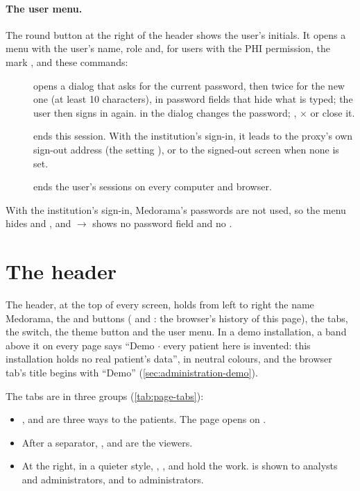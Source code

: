 \paragraph{The user menu.} The round button at the right of the header shows the user's
initials. It opens a menu with the user's name, role and, for users with the PHI permission, the
mark , and these commands:
\begin{description}
\item[] opens a dialog that asks for the current password, then twice for
  the new one (at least 10 characters), in password fields that hide what is typed; the user
  then signs in again.  in the dialog changes the password; , $\times$ or
   close it.
\item[] ends this session. With the institution's sign-in, it leads to the proxy's
  own sign-out address (the setting ), or to the signed-out screen when
  none is set.
\item[] ends the user's sessions on every computer and browser.
\end{description}
With the institution's sign-in, Medorama's passwords are not used, so the menu hides
 and , and  $\rightarrow$ 
shows no password field and no .

\section{The header}
\label{sec:page-header}

The header, at the top of every screen, holds from left to right the name Medorama, the
\ui{$\langle$} and \ui{$\rangle$} buttons ( and : the browser's history of
this page), the tabs, the  switch, the theme button and the user menu. In a
demo installation, a band above it on every page says ``Demo $\cdot$ every patient here is
invented: this installation holds no real patient's data'', in neutral colours, and the browser
tab's title begins with ``Demo'' (\cref{sec:administration-demo}).

The tabs are in three groups (\cref{tab:page-tabs}):
\begin{itemize}
\item {},  and  are three ways to the patients. The
  page opens on .
\item After a separator, ,  and  are the viewers.
\item At the right, in a quieter style, , ,  and 
  hold the work.  is shown to analysts and administrators, and  to
  administrators.
\end{itemize}

